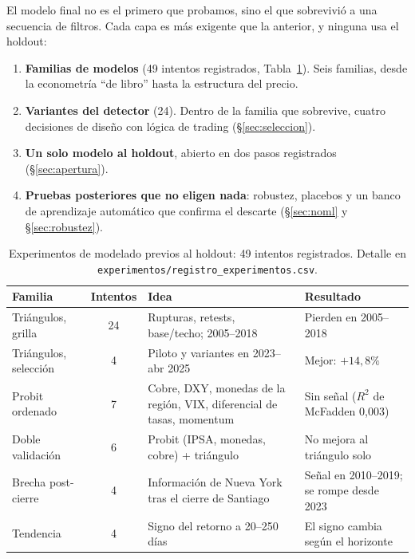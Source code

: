 \documentclass[10pt,a4paper]{article}
\begin{document}
El modelo final no es el primero que probamos, sino el que sobrevivió a una secuencia
de filtros. Cada capa es más exigente que la anterior, y ninguna usa el holdout:
\begin{enumerate}
  \item \textbf{Familias de modelos} (49 intentos registrados,
        Tabla~\ref{tab:descartados}). Seis familias, desde la econometría ``de libro''
        hasta la estructura del precio.
  \item \textbf{Variantes del detector} (24). Dentro de la familia que sobrevive, cuatro
        decisiones de diseño con lógica de trading (§\ref{sec:seleccion}).
  \item \textbf{Un solo modelo al holdout}, abierto en dos pasos registrados
        (§\ref{sec:apertura}).
  \item \textbf{Pruebas posteriores que no eligen nada}: robustez, placebos y un banco
        de aprendizaje automático que confirma el descarte (§\ref{sec:noml} y
        §\ref{sec:robustez}).
\end{enumerate}

\begin{table}[htb]\centering\small
\renewcommand{\arraystretch}{1.1}
\begin{tabularx}{\textwidth}{@{}>{\raggedright\arraybackslash}p{3.2cm}c>{\raggedright\arraybackslash}X>{\raggedright\arraybackslash}p{3.9cm}@{}}
\toprule
Familia & Intentos & Idea & Resultado \\
\midrule
Triángulos, grilla & 24 & Rupturas, retests, base/techo; 2005--2018 & Pierden en 2005--2018 \\
Triángulos, selección & 4 & Piloto y variantes en 2023--abr 2025 & Mejor: $+14{,}8\%$ \\
Probit ordenado & 7 & Cobre, DXY, monedas de la región, VIX, diferencial de tasas, momentum & Sin señal ($R^2$ de McFadden 0,003) \\
Doble validación & 6 & Probit (IPSA, monedas, cobre) + triángulo & No mejora al triángulo solo \\
Brecha post-cierre & 4 & Información de Nueva York tras el cierre de Santiago & Señal en 2010--2019; se rompe desde 2023 \\
Tendencia & 4 & Signo del retorno a 20--250 días & El signo cambia según el horizonte \\
\bottomrule
\end{tabularx}
\caption{Experimentos de modelado previos al holdout: 49 intentos registrados.
Detalle en \texttt{experimentos/registro\_experimentos.csv}.}\label{tab:descartados}
\end{table}
\end{document}
